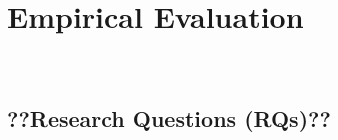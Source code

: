 \section{Empirical Evaluation}~\label{sec:evaluation}


\subsection{??Research Questions (RQs)??}~\label{subsec:RQs}